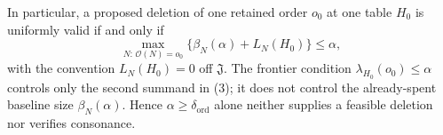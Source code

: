 In particular, a proposed deletion of one retained order \(o_0\) at one table \(H_0\) is uniformly valid if and only if
\[
 \max_{N:\,\mathcal O(N)=o_0}
 \{\beta_N(\alpha)+L_N(H_0)\}\le\alpha, \tag{3}
\]
with the convention \(L_N(H_0)=0\) off \(\mathfrak J\). The frontier condition \(\lambda_{H_0}(o_0)\le\alpha\) controls only the second summand in (3); it does not control the already-spent baseline size \(\beta_N(\alpha)\). Hence \(\alpha\ge\delta_{\mathrm{ord}}\) alone neither supplies a feasible deletion nor verifies consonance.
